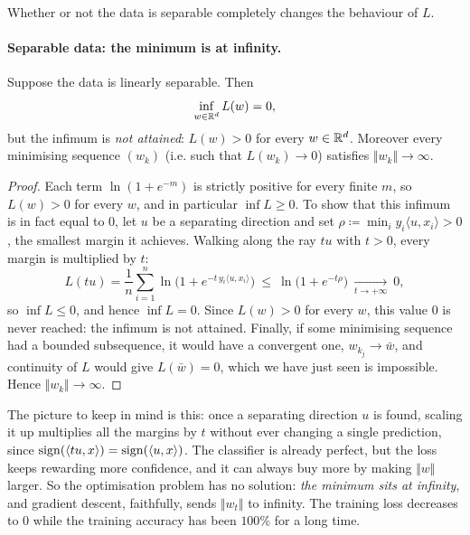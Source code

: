 Whether or not the data is separable completely changes the behaviour of $L$.

\paragraph{Separable data: the minimum is at infinity.}

\begin{prop}
\label{prop:sep-no-min}
Suppose the data is linearly separable. Then
\[
\inf_{w \in \mathbb{R}^d} L(w) = 0 ,
\]
but the infimum is \emph{not attained}: $L(w) > 0$ for every $w \in \mathbb{R}^d$. Moreover
every minimising sequence $(w_k)$ (i.e. such that $L(w_k) \to 0$) satisfies $\Vert w_k \Vert \to \infty$.
\end{prop}

\begin{proof}
Each term $\ln(1 + e^{-m})$ is strictly positive for every finite $m$, so $L(w) > 0$
for every $w$, and in particular $\inf L \geq 0$. To show that this infimum is in fact
equal to $0$, let $u$ be a separating direction and set $\rho \coloneqq \min_i y_i
\langle u, x_i \rangle > 0$, the smallest margin it achieves. Walking along the ray
$t u$ with $t > 0$, every margin is multiplied by $t$:
\[
L(t u) = \frac1n \sum_{i=1}^n \ln\big( 1 + e^{-t\, y_i \langle u, x_i\rangle} \big)
\ \leq \ \ln\big( 1 + e^{-t \rho} \big) \ \xrightarrow[t \to +\infty]{} \ 0 ,
\]
so $\inf L \leq 0$, and hence $\inf L = 0$. Since $L(w) > 0$ for every $w$, this
value $0$ is never reached: the infimum is not attained. Finally, if some minimising
sequence had a bounded subsequence, it would have a convergent one,
$w_{k_j} \to \bar w$, and continuity of $L$ would give $L(\bar w) = 0$, which we have
just seen is impossible. Hence $\Vert w_k \Vert \to \infty$.
\end{proof}

The picture to keep in mind is this: once a separating direction $u$ is found, scaling
it up multiplies all the margins by $t$ without ever changing a single prediction,
since $\mathop{ \rm sign}(\langle t u, x\rangle) = \mathop{ \rm sign}(\langle u, x \rangle)$. The classifier is
already perfect, but the loss keeps rewarding more confidence, and it can always buy
more by making $\Vert w \Vert$ larger. So the optimisation problem has no solution:
\emph{the minimum sits at infinity}, and gradient descent, faithfully, sends $\Vert
w_t \Vert$ to infinity. The training loss decreases to $0$ while the training accuracy has
been $100\%$ for a long time.

